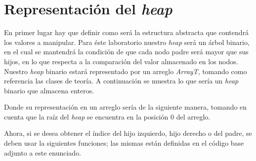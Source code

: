 \documentclass[11pt,letterpaper]{article}
\begin{document}
\section*{Representación del \textit{heap}}
\sloppy
En primer lugar hay que definir como será la estructura abstracta que contendrá los valores a manipular. Para éste laboratorio nuestro \textit{heap} será un árbol binario, en el cual se mantendrá la condición de que cada nodo padre será mayor que sus hijos, en lo que respecta a la comparación del valor almacenado en los nodos. Nuestro \textit{heap} binario estará representado por un arreglo \textit{ArrayT}, tomando como referencia las clases de teoría. A continuación se muestra lo que sería un \textit{heap} binario que almacena enteros.
\\
\begin{center}


\end{center}

\vspace{1em}

Donde su representación en un arreglo sería de la siguiente manera, tomando en cuenta que la raíz del \textit{heap} se encuentra en la posición $0$ del arreglo.

\vspace{1em}

\begin{center}
\end{center}

\newpage

Ahora, si se desea obtener el índice del hijo izquierdo, hijo derecho o del padre, se deben usar la siguientes funciones; las mismas están definidas en el código base adjunto a este enunciado.
\end{document}

